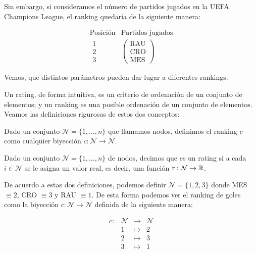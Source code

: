 \begin{ejemplo}
Sin embargo, si consideramos el número de partidos jugados en la UEFA Champions League, el ranking quedaría de la siguiente manera:

\[
\begin{array}{cc}
\text{Posición} & \text{Partidos jugados}\\ 
\begin{array}{c}
\text{1}\\
\text{2}\\
\text{3}
\end{array} & \left(\begin{array}{c}
\text{RAU}\\
\text{CRO}\\
\text{MES}
\end{array} \right)
\end{array}
\] 

Vemos, que distintos parámetros pueden dar lugar a diferentes rankings.

\end{ejemplo}


Un rating, de forma intuitiva, es un criterio de ordenación de un conjunto de elementos; y un ranking es una posible ordenación de un conjunto de elementos.\\

Veamos las definiciones rigurosas de estos dos conceptos:

\begin{defi} \label{def:ranking}
Dado un conjunto $\mathcal{N} = \{1,\dots,n\}$ que llamamos nodos, definimos el ranking $c$ como cualquier biyección $c : \mathcal{N} \to \mathcal{N}$.
\end{defi}

\begin{defi}
Dado un conjunto $\mathcal{N} = \{1,\dots, n\}$ de nodos, decimos que es un rating si a cada $i \in \mathcal{N}$ se le asigna un valor real, es decir, una función $\mathrm{r} : \mathcal{N} \to \mathbb{R}$.
\end{defi}

De acuerdo a estas dos definiciones, podemos definir $\mathcal{N} = \{1,2,3 \}$ donde MES $\equiv 2$, CRO $\equiv 3$ y RAU $\equiv 1$. De esta forma podemos ver el ranking de goles como la biyección $c: \mathcal{N} \to \mathcal{N}$ definida de la siguiente manera:

\[ \begin{array}{rlll}
c: & \mathcal{N} & \to & \mathcal{N}\\
& 1 & \mapsto & 2\\
& 2 & \mapsto & 3\\
& 3 & \mapsto & 1
\end{array} \] 

